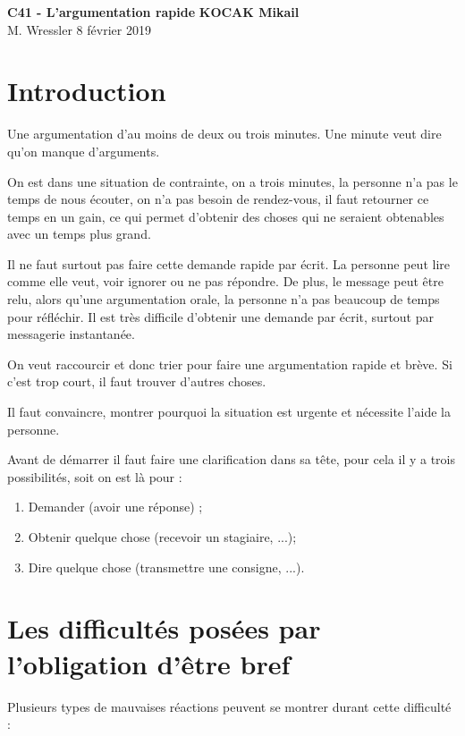 \documentclass[final, a4paper, 11pt]{article}
\begin{document}
\noindent
\large\textbf{C41 - L'argumentation rapide} \hfill \textbf{KOCAK Mikail} \\
\normalsize M. Wressler \hfill 8 février 2019 \\[1pt]

\tableofcontents

\section{Introduction}
Une argumentation d'au moins de deux ou trois minutes. Une minute veut dire qu'on manque d'arguments.

On est dans une situation de contrainte, on a trois minutes, la personne n'a pas le temps de nous écouter, on n'a pas besoin de rendez-vous, il faut retourner ce temps en un gain, ce qui permet d'obtenir des choses qui ne seraient obtenables avec un temps plus grand.

Il ne faut surtout pas faire cette demande rapide par écrit. La personne peut lire comme elle veut, voir ignorer ou ne pas répondre. De plus, le message peut être relu, alors qu'une argumentation orale, la personne n'a pas beaucoup de temps pour réfléchir. Il est très difficile d'obtenir une demande par écrit, surtout par messagerie instantanée.

On veut raccourcir et donc trier pour faire une argumentation rapide et brève. Si c'est trop court, il faut trouver d'autres choses.

Il faut convaincre, montrer pourquoi la situation est urgente et nécessite l'aide la personne.

Avant de démarrer il faut faire une clarification dans sa tête, pour cela il y a trois possibilités, soit on est là pour :
\begin{enumerate}
	\item Demander (avoir une réponse) ;
	\item Obtenir quelque chose (recevoir un stagiaire, ...);
	\item Dire quelque chose (transmettre une consigne, ...).
\end{enumerate}

\section{Les difficultés posées par l'obligation d'être bref}
Plusieurs types de mauvaises réactions peuvent se montrer durant cette difficulté :
\end{document}
